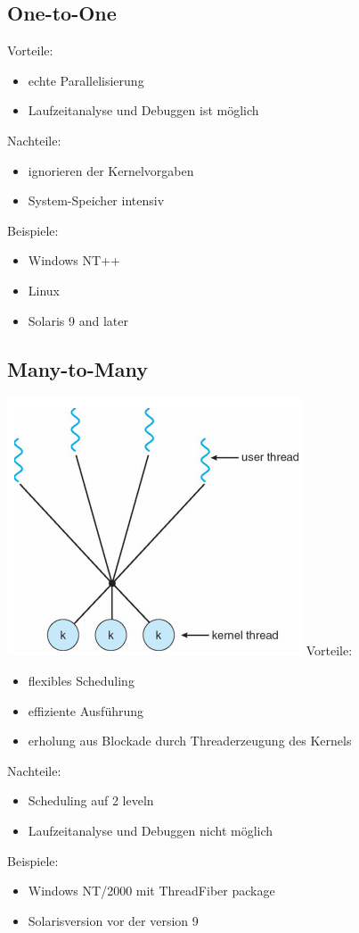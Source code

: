\documentclass[a4paper]{scrreprt}
\begin{document}
	\subsection{One-to-One}
		Vorteile:
		\begin{itemize}
			\item echte Parallelisierung
			\item Laufzeitanalyse und Debuggen ist möglich
		\end{itemize}
		Nachteile:
		\begin{itemize}
			\item ignorieren der Kernelvorgaben
			\item System-Speicher intensiv
		\end{itemize}
		Beispiele:
		\begin{itemize}
			\item Windows NT++
			\item Linux
			\item Solaris 9 and later
		\end{itemize}
		
	\subsection{Many-to-Many}
		\includegraphics[scale = 0.6]{graphics/many_to_many.png}
		Vorteile:
		\begin{itemize}
			\item flexibles Scheduling
			\item effiziente Ausführung
			\item erholung aus Blockade durch Threaderzeugung des Kernels
		\end{itemize}
		Nachteile:
		\begin{itemize}
			\item Scheduling auf 2 leveln
			\item Laufzeitanalyse und Debuggen nicht möglich
		\end{itemize}
		Beispiele:
		\begin{itemize}
			\item Windows NT/2000 mit ThreadFiber package
			\item Solarisversion vor der version 9
		\end{itemize}
			
\end{document}
